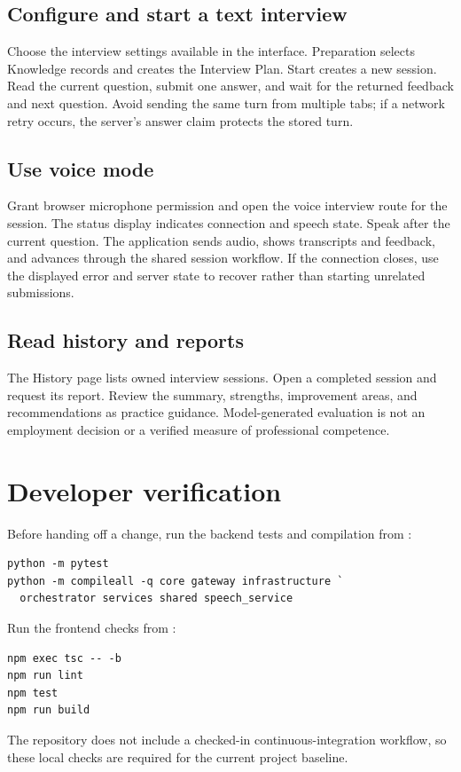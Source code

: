 \subsection{Configure and start a text interview}

Choose the interview settings available in the interface. Preparation selects Knowledge records and creates the Interview Plan. Start creates a new session. Read the current question, submit one answer, and wait for the returned feedback and next question. Avoid sending the same turn from multiple tabs; if a network retry occurs, the server's answer claim protects the stored turn.

\subsection{Use voice mode}

Grant browser microphone permission and open the voice interview route for the session. The status display indicates connection and speech state. Speak after the current question. The application sends audio, shows transcripts and feedback, and advances through the shared session workflow. If the connection closes, use the displayed error and server state to recover rather than starting unrelated submissions.

\subsection{Read history and reports}

The History page lists owned interview sessions. Open a completed session and request its report. Review the summary, strengths, improvement areas, and recommendations as practice guidance. Model-generated evaluation is not an employment decision or a verified measure of professional competence.

\section{Developer verification}

Before handing off a change, run the backend tests and compilation from :

\begin{lstlisting}[language={},caption={Backend verification.}]
python -m pytest
python -m compileall -q core gateway infrastructure `
  orchestrator services shared speech_service
\end{lstlisting}

Run the frontend checks from :

\begin{lstlisting}[language={},caption={Frontend verification.}]
npm exec tsc -- -b
npm run lint
npm test
npm run build
\end{lstlisting}

The repository does not include a checked-in continuous-integration workflow, so these local checks are required for the current project baseline.
